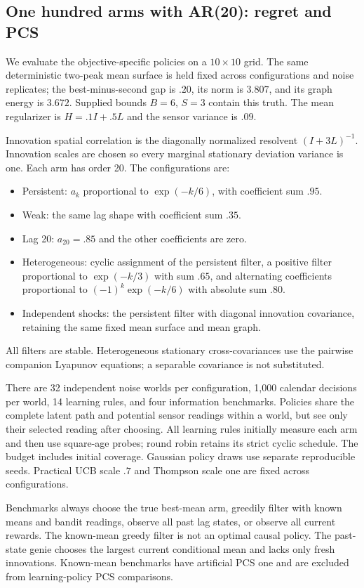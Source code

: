 \subsection{One hundred arms with AR(20): regret and PCS}
We evaluate the objective-specific policies on a $10\times10$ grid. The same deterministic two-peak mean surface is held fixed across configurations and noise replicates; the best-minus-second gap is $.20$, its norm is $3.807$, and its graph energy is $3.672$. Supplied bounds $B=6$, $S=3$ contain this truth. The mean regularizer is $H=.1I+.5L$ and the sensor variance is $.09$.

Innovation spatial correlation is the diagonally normalized resolvent $(I+3L)^{-1}$. Innovation scales are chosen so every marginal stationary deviation variance is one. Each arm has order 20. The configurations are:
\begin{itemize}
\item Persistent: $a_k$ proportional to $\exp(-k/6)$, with coefficient sum $.95$.
\item Weak: the same lag shape with coefficient sum $.35$.
\item Lag 20: $a_{20}=.85$ and the other coefficients are zero.
\item Heterogeneous: cyclic assignment of the persistent filter, a positive filter proportional to $\exp(-k/3)$ with sum $.65$, and alternating coefficients proportional to $(-1)^k\exp(-k/6)$ with absolute sum $.80$.
\item Independent shocks: the persistent filter with diagonal innovation covariance, retaining the same fixed mean surface and mean graph.
\end{itemize}
All filters are stable. Heterogeneous stationary cross-covariances use the pairwise companion Lyapunov equations; a separable covariance is not substituted.

There are 32 independent noise worlds per configuration, 1,000 calendar decisions per world, 14 learning rules, and four information benchmarks. Policies share the complete latent path and potential sensor readings within a world, but see only their selected reading after choosing. All learning rules initially measure each arm and then use square-age probes; round robin retains its strict cyclic schedule. The budget includes initial coverage. Gaussian policy draws use separate reproducible seeds. Practical UCB scale $.7$ and Thompson scale one are fixed across configurations.

Benchmarks always choose the true best-mean arm, greedily filter with known means and bandit readings, observe all past lag states, or observe all current rewards. The known-mean greedy filter is not an optimal causal policy. The past-state genie chooses the largest current conditional mean and lacks only fresh innovations. Known-mean benchmarks have artificial PCS one and are excluded from learning-policy PCS comparisons.

